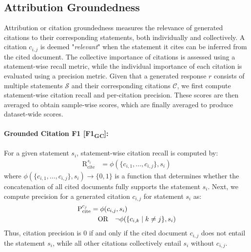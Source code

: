 \documentclass{article} %
\renewcommand{\cite}[1]{\citep{#1}}
\begin{document}
\subsection{Attribution Groundedness}
Attribution or citation groundedness measures the relevance of generated citations to their corresponding statements, both individually and collectively. A citation \(c_{i,j}\) is deemed "\textit{relevant}" when the statement it cites can be inferred from the cited document. The collective importance of citations is assessed using a statement-wise recall metric, while the individual importance of each citation is evaluated using a precision metric. Given that a generated response \(r\) consists of multiple statements \(\mathcal{S}\) and their corresponding citations \(\mathcal{C}\), we first compute statement-wise citation recall and per-citation precision. These scores are then averaged to obtain sample-wise scores, which are finally averaged to produce dataset-wide scores.

\paragraph{Grounded Citation F1 [F1\textsubscript{GC}]:}
For a given statement \(s_i\), statement-wise citation recall is computed by:
%
\begin{align}
    \text{R}_\text{cite}^{s_i} &= \phi(\{c_{i,1}, \ldots, c_{i,j}\}, s_i)
\end{align}
%
where \(\phi(\{c_{i,1}, \ldots, c_{i,j}\}, s_i) \rightarrow \{0,1\}\) is a function that determines whether the concatenation of all cited documents fully supports the statement \(s_i\). Next, we compute precision for a generated citation \(c_{i,j}\) for statement \(s_i\) as:
%
\begin{align}
    \text{P}_\text{cite}^{c_j} &= \phi(c_{i,j}, s_i) \\
    &\quad \text{OR} \quad \neg \phi(\{c_{i,k} \mid k \neq j\}, s_i) \notag
\end{align}
%
Thus, citation precision is 0 if and only if the cited document \( c_{i,j}\) does not entail the statement \(s_i\), while all other citations collectively entail \(s_i\) without \( c_{i,j}\).
 
\end{document}
